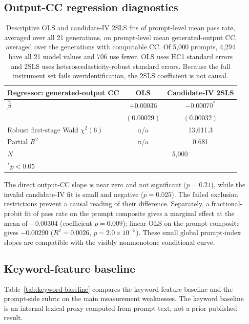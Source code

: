 \documentclass{article}
\begin{document}
\subsection{Output-CC regression diagnostics}

\begin{table}[h]
\centering
\caption{Descriptive OLS and candidate-IV 2SLS fits of prompt-level mean pass rate, averaged over all 21 generations, on prompt-level mean generated-output CC, averaged over the generations with computable CC. Of 5{,}000 prompts, 4{,}294 have all 21 model values and 706 use fewer. OLS uses HC1 standard errors and 2SLS uses heteroscedasticity-robust standard errors. Because the full instrument set fails overidentification, the 2SLS coefficient is not causal.}
\label{tab:ols-vs-2sls}
\begin{tabular}{@{}lcc@{}}
\toprule
Regressor: generated-output CC & OLS & Candidate-IV 2SLS \\
\midrule
$\hat{\beta}$ & $+0.00036$ & $-0.00070^{*}$ \\
              & $(0.00029)$ & $(0.00032)$ \\
\midrule
Robust first-stage Wald $\chi^2(6)$ & n/a & 13{,}611.3 \\
Partial $R^2$ & n/a & 0.681 \\
$N$ & \multicolumn{2}{c}{5{,}000} \\
\bottomrule
\multicolumn{3}{l}{\footnotesize $^{*}p<0.05$}
\end{tabular}
\end{table}

The direct output-CC slope is near zero and not significant ($p=0.21$), while the invalid candidate-IV fit is small and negative ($p=0.025$). The failed exclusion restrictions prevent a causal reading of their difference. Separately, a fractional-probit fit of pass rate on the prompt composite gives a marginal effect at the mean of $-0.00304$ (coefficient $p=0.009$); linear OLS on the prompt composite gives $-0.00290$ ($R^2=0.0026$, $p=2.0\times10^{-5}$). These small global prompt-index slopes are compatible with the visibly nonmonotone conditional curve.

\subsection{Keyword-feature baseline}

Table~\ref{tab:keyword-baseline} compares the keyword-feature baseline and the prompt-side rubric on the main measurement weaknesses. The keyword baseline is an internal lexical proxy computed from prompt text, not a prior published result.
\end{document}
